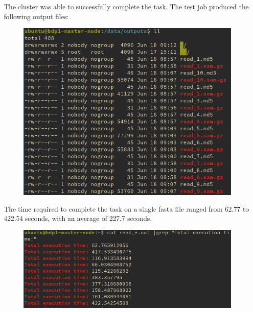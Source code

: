 \documentclass{article}
\begin{document}
The cluster was able to successfully complete the task.
The test job produced the following output files:

\begin{figure}[!h]
    \center
    \includegraphics[width=\textwidth]{./images/condor_test_out.png}
\end{figure}
\FloatBarrier

The time required to complete the task on a single fasta file ranged from 62.77 to 422.54 seconds, with an average of 227.7 seconds.

\begin{figure}[!h]
    \center
    \includegraphics[width=\textwidth]{./images/time_condor.png}
\end{figure}
\FloatBarrier
\end{document}
